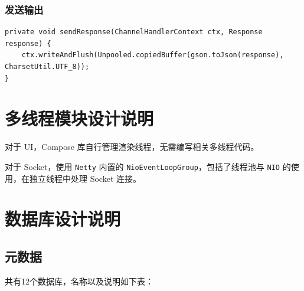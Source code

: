\documentclass{article}
\begin{document}
\subsubsection{发送输出}

\begin{lstlisting}
private void sendResponse(ChannelHandlerContext ctx, Response response) {
    ctx.writeAndFlush(Unpooled.copiedBuffer(gson.toJson(response), CharsetUtil.UTF_8));
}
\end{lstlisting}

\section{多线程模块设计说明}

对于 UI，Compose 库自行管理渲染线程，无需编写相关多线程代码。

对于 Socket，使用 \texttt{Netty} 内置的 \texttt{NioEventLoopGroup}，包括了线程池与 \texttt{NIO} 的使用，在独立线程中处理 Socket 连接。

\section{数据库设计说明}
\subsection{元数据}

共有12个数据库，名称以及说明如下表：

\begin{table}[H]
  \centering
\end{table}
\end{document}
